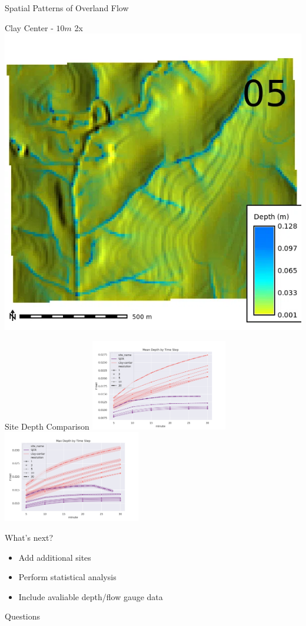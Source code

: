 \documentclass[
  ignorenonframetext,
]{beamer}
\providecommand{\tightlist}{%
  \setlength{\itemsep}{0pt}\setlength{\parskip}{0pt}}\usepackage{longtable,booktabs,array}
\begin{document}
\begin{frame}{Spatial Patterns of Overland Flow}
\begin{block}{Clay Center - \(10m\) 2x}
\label{clay-center---10m-2x}
\includegraphics{../output/clay-center/sensitivity_1/clay-center_depth_10_2_s_average.webp}
\end{block}

\begin{block}{Site Depth Comparison}
\label{site-depth-comparison}
\includegraphics[width=0.45\textwidth,height=\textheight]{../output/agu2024_minute_mean_resolution.png}
\includegraphics[width=0.45\textwidth,height=\textheight]{../output/agu2024_minute_max_resolution.png}
\end{block}
\end{frame}

\begin{frame}{What's next?}
\label{whats-next}
\begin{itemize}
\tightlist
\item
  Add additional sites
\item
  Perform statistical analysis
\item
  Include avaliable depth/flow gauge data
\end{itemize}
\end{frame}

\begin{frame}{Questions}
\label{questions}
\end{frame}
\end{document}
